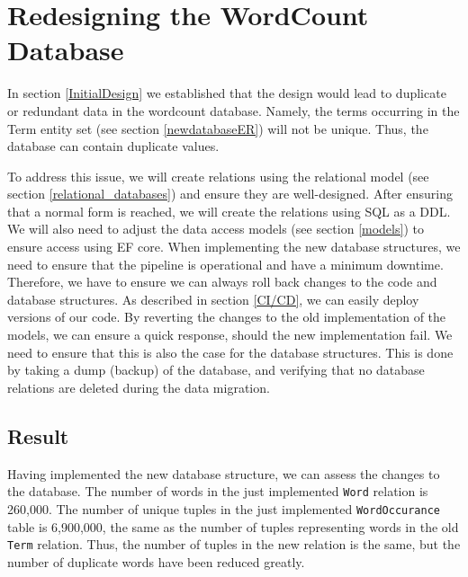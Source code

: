\section{Redesigning the WordCount Database}
In section \ref{InitialDesign} we established that the design would lead to duplicate or redundant data in the wordcount database.
Namely, the terms occurring in the Term entity set (see section \ref{newdatabaseER}) will not be unique. 
Thus, the database can contain duplicate values.
 
To address this issue, we will create relations using the relational model (see section \ref{relational_databases}) and ensure they are well-designed.
After ensuring that a normal form is reached, we will create the relations using SQL as a DDL.
We will also need to adjust the data access models (see section \ref{models}) to ensure access using EF core.
When implementing the new database structures, we need to ensure that the pipeline is operational and have a minimum downtime. 
Therefore, we have to ensure we can always roll back changes to the code and database structures.
As described in section \ref{CI/CD}, we can easily deploy versions of our code.
By reverting the changes to the old implementation of the models, we can ensure a quick response, should the new implementation fail.
We need to ensure that this is also the case for the database structures.
This is done by taking a dump (backup) of the database, and verifying that no database relations are deleted during the data migration.




\subsection{Result}
Having implemented the new database structure, we can assess the changes to the database. 
The number of words in the just implemented \texttt{Word} relation is 260,000.
The number of unique tuples in the just implemented \texttt{WordOccurance} table is 6,900,000, the same as the number of tuples representing words in the old \texttt{Term} relation.
Thus, the number of tuples in the new relation is the same, but the number of duplicate words have been reduced greatly.

